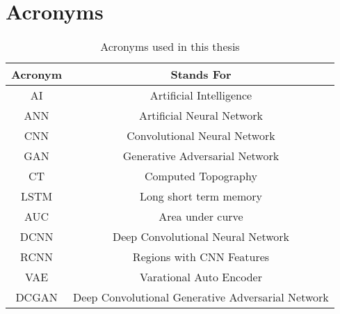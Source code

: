 
\chapter*{Acronyms}
\begin{table}[h]
    \centering
    \begin{tabular}{|c|c|}
        \hline
         Acronym
         &  Stands For\\
        \hline
        AI & Artificial Intelligence\\
        ANN & Artificial Neural Network\\
        CNN & Convolutional Neural Network\\
        GAN & Generative Adversarial Network\\
        CT & Computed Topography\\
        LSTM & Long short term memory\\
        AUC & Area under curve\\
        DCNN & Deep Convolutional Neural Network\\
        RCNN & Regions with CNN Features\\
        VAE & Varational Auto Encoder\\
        DCGAN & Deep Convolutional Generative Adversarial Network\\
        \hline
    \end{tabular}
    \caption{Acronyms used in this thesis}
    \label{tab:Table of Acronyms}

\end{table}
 

